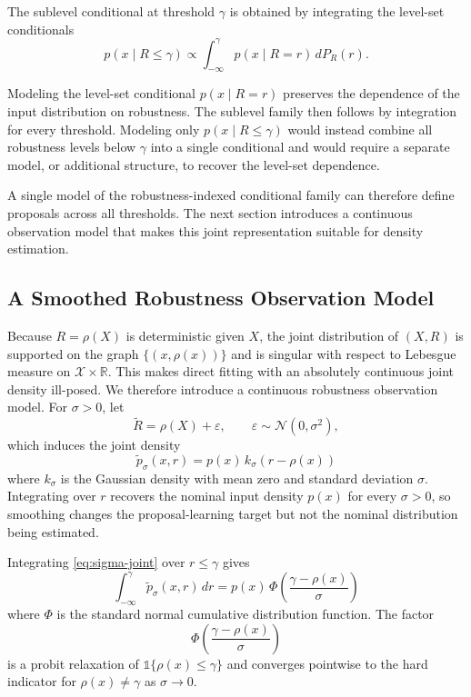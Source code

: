 \documentclass[twoside,11pt]{article}
\begin{document}
The sublevel conditional at threshold $\gamma$ is obtained by integrating the level-set conditionals
\begin{equation}
    \label{eq:exact-joint-integral}
    p(x\mid R\leq\gamma)
    \propto
    \int_{-\infty}^{\gamma}
    p(x\mid R=r)\,dP_R(r).
\end{equation}

Modeling the level-set conditional $p(x\mid R=r)$ preserves the dependence of the input distribution on robustness. The sublevel family then follows by integration for every threshold. Modeling only $p(x\mid R\leq\gamma)$ would instead combine all robustness levels below $\gamma$ into a single conditional and would require a separate model, or additional structure, to recover the level-set dependence.

A single model of the robustness-indexed conditional family can therefore define proposals across all thresholds. The next section introduces a continuous observation model that makes this joint representation suitable for density estimation.

\subsection{A Smoothed Robustness Observation Model}
\label{sec:sigma-model}

Because $R=\rho(X)$ is deterministic given $X$, the joint distribution of $(X,R)$ is supported on the graph $\{(x,\rho(x))\}$ and is singular with respect to Lebesgue measure on $\mathcal{X}\times\mathbb{R}$. This makes direct fitting with an absolutely continuous joint density ill-posed. We therefore introduce a continuous robustness observation model. For $\sigma>0$, let
\[
    \tilde{R}
    =
    \rho(X)+\varepsilon,
    \qquad
    \varepsilon\sim\mathcal{N}(0,\sigma^2),
\]
which induces the joint density
\begin{equation}
    \label{eq:sigma-joint}
    \tilde{p}_\sigma(x,r)
    =
    p(x)\,k_\sigma(r-\rho(x))
\end{equation}
where $k_\sigma$ is the Gaussian density with mean zero and standard deviation $\sigma$. Integrating over $r$ recovers the nominal input density $p(x)$ for every $\sigma>0$, so smoothing changes the proposal-learning target but not the nominal distribution being estimated.

Integrating \cref{eq:sigma-joint} over $r\leq\gamma$ gives
\begin{equation}
    \label{eq:probit-lemma}
    \int_{-\infty}^{\gamma}
    \tilde{p}_\sigma(x,r)\,dr
    =
    p(x)\,
    \Phi\!\left(
        \frac{\gamma-\rho(x)}{\sigma}
    \right)
\end{equation}
where $\Phi$ is the standard normal cumulative distribution function. The factor
\[
    \Phi\!\left(
        \frac{\gamma-\rho(x)}{\sigma}
    \right)
\]
is a probit relaxation of $\mathds{1}\{\rho(x)\leq\gamma\}$ and converges pointwise to the hard indicator for $\rho(x)\neq\gamma$ as $\sigma\to0$.
\end{document}
